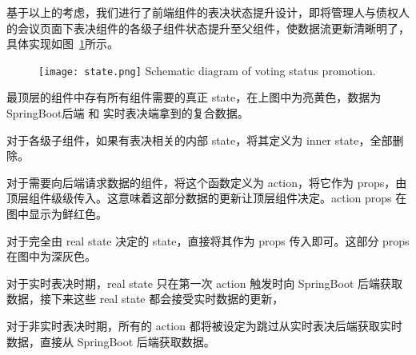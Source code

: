   基于以上的考虑，我们进行了前端组件的表决状态提升设计，即将管理人与债权人的会议页面下表决组件的各级子组件状态提升至父组件，使数据流更新清晰明了，具体实现如图~\ref{fig:state}所示。

  \begin{figure}[!htp]
    \centering
    \texttt{[image: state.png]}
      {Schematic diagram of voting status promotion.}
   \label{fig:state}
  \end{figure}

  最顶层的组件中存有所有组件需要的真正 state，在上图中为亮黄色，数据为 SpringBoot后端 和 实时表决端拿到的复合数据。
  
  对于各级子组件，如果有表决相关的内部 state，将其定义为 inner state，全部删除。

  对于需要向后端请求数据的组件，将这个函数定义为 action，将它作为 props，由顶层组件级级传入。这意味着这部分数据的更新让顶层组件决定。action props 在图中显示为鲜红色。

  对于完全由 real state 决定的 state，直接将其作为 props 传入即可。这部分 props 在图中为深灰色。

对于实时表决时期，real state 只在第一次 action 触发时向 SpringBoot 后端获取数据，接下来这些 real state 都会接受实时数据的更新，

对于非实时表决时期，所有的 action 都将被设定为跳过从实时表决后端获取实时数据，直接从 SpringBoot 后端获取数据。